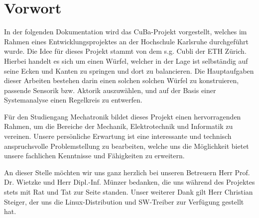 \section*{Vorwort}
In der folgenden Dokumentation wird das \ac{CuBa}-Projekt vorgestellt, welches im Rahmen eines Entwicklungsprojektes an der Hochschule Karlsruhe durchgeführt wurde. Die Idee für dieses Projekt stammt von dem s.g. Cubli der ETH Zürich. Hierbei handelt es sich um einen Würfel, welcher in der Lage ist selbständig auf seine Ecken und Kanten zu springen und dort zu balancieren. Die Hauptaufgaben dieser Arbeiten bestehen darin einen solchen solchen Würfel zu konstruieren, passende Sensorik bzw. Aktorik auszuwählen, und auf der Basis einer Systemanalyse einen Regelkreis zu entwerfen. 
\newline

Für den Studiengang Mechatronik bildet dieses Projekt einen hervorragenden Rahmen, um die Bereiche der Mechanik, Elektrotechnik und Informatik zu vereinen. Unsere persönliche Erwartung ist eine interessante und technisch anspruchsvolle Problemstellung zu bearbeiten, welche uns die Möglichkeit bietet unsere fachlichen Kenntnisse und Fähigkeiten zu erweitern.
\newline

An dieser Stelle möchten wir uns ganz herzlich bei unseren Betreuern Herr Prof. Dr. Wietzke und Herr Dipl.-Inf. Münzer bedanken, die uns während des Projektes stets mit Rat und Tat zur Seite standen. Unser weiterer Dank gilt Herr Christian Steiger, der uns die Linux-Distribution und SW-Treiber zur Verfügung gestellt hat.